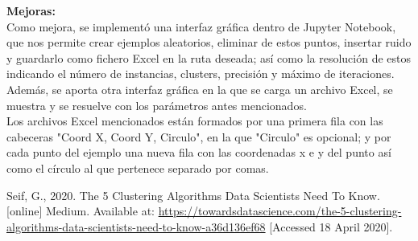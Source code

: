 \documentclass[conference,a4paper]{IEEEtran}
\begin{document}
\textbf{Mejoras:}\\

Como mejora, se implementó una interfaz gráfica dentro de Jupyter Notebook, que nos permite crear ejemplos aleatorios, eliminar de estos puntos, insertar ruido y guardarlo como fichero Excel en la ruta deseada; así como la resolución de estos indicando el número de instancias, clusters, precisión y máximo de iteraciones.\\
Además, se aporta otra interfaz gráfica en la que se carga un archivo Excel, se muestra y se resuelve con los parámetros antes mencionados.\\
Los archivos Excel mencionados están formados por una primera fila con las cabeceras "Coord X, Coord Y, Circulo", en la que "Circulo" es opcional; y por cada punto del ejemplo una nueva fila con las coordenadas x e y del punto así como el círculo al que pertenece separado por comas.



\clearpage
\begin{thebibliography}{9}
	
	\label{bib:georgeSeif}
	Seif, G., 2020. The 5 Clustering Algorithms Data Scientists Need To Know. [online] Medium. 
	Available at: \href{https://towardsdatascience.com/the-5-clustering-algorithms-data-scientists-need-to-know-a36d136ef68}{https://towardsdatascience.com/the-5-clustering-algorithms-data-scientists-need-to-know-a36d136ef68}
	[Accessed 18 April 2020].

\end{thebibliography}
\end{document}
